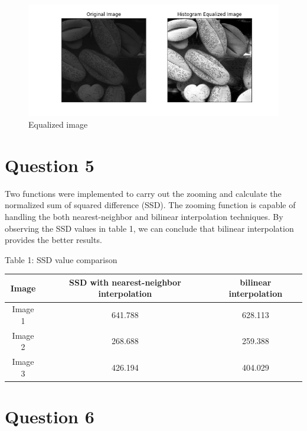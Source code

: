 \documentclass[11pt]{article}
\begin{document}
\begin{figure}[!h]
    \centering
    \includegraphics[width=\textwidth]{Images/41.jpg}
    \caption{Equalized image}
    \label{41}
\end{figure}

\section*{Question 5}

Two functions were implemented to carry out the zooming and calculate the normalized sum of squared difference (SSD). The zooming function is 
capable of handling the both nearest-neighbor and bilinear interpolation techniques. By observing the SSD values in table 1, we can conclude that 
bilinear interpolation provides the better results.

\begin{center}
    Table 1: SSD value comparison
    \begin{tabular}{ |c|c|c| } 
        \hline
        Image & SSD with nearest-neighbor interpolation & bilinear interpolation \\ 
        \hline
        Image 1 & 641.788 & 628.113 \\
        \hline
        Image 2 & 268.688 & 259.388 \\
        \hline
        Image 3 & 426.194 & 404.029 \\
        \hline
    \end{tabular}
\end{center}

\section*{Question 6}
\end{document}
